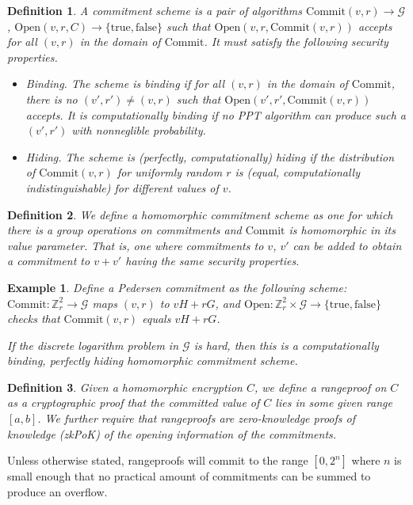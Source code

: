 \documentclass[letterpaper]{article}
\newtheorem{defn}{Definition}
\newtheorem{expl}{Example}
\newcommand{\Commit}{\mathrm{Commit}}
\newcommand{\Open}{\mathrm{Open}}
\newcommand{\truth}{\{\mathrm{true}, \mathrm{false}\}}
\begin{document}
\begin{defn} A \emph{commitment scheme} is a pair of algorithms
$\Commit(v, r)\to\mathcal{G}$, $\Open(v, r, C)\to\truth$ such that
$\Open(v, r, \Commit(v, r))$ accepts for all $(v, r)$ in the domain
of $\Commit$. It must satisfy the following security properties.
\begin{itemize}
\item \emph{Binding.} The scheme is \emph{binding} if for all $(v, r)$ in the
domain of $\Commit$, there is no $(v',r')\neq(v,r)$ such that
$\Open(v', r', \Commit(v, r))$ accepts.
It is \emph{computationally binding} if no PPT algorithm can produce such a
$(v', r')$ with nonneglible probability.
\item \emph{Hiding.} The scheme is \emph{(perfectly, computationally) hiding}
if the distribution of $\mathrm{Commit}(v, r)$ for uniformly random $r$ is
(equal, computationally indistinguishable) for different values of $v$.
\end{itemize}
\end{defn}
\begin{defn} We define a \emph{homomorphic commitment scheme} as one
for which there is a group operations on commitments and $\Commit$ is
homomorphic in its value parameter. That is, one where commitments to
$v$, $v'$ can be added to obtain a commitment to $v+v'$ having the
same security properties.
\end{defn}

\begin{expl} Define a \emph{Pedersen commitment} as the following scheme:
$\Commit:\mathbb{Z}_r^2\to\mathcal{G}$ maps $(v, r)$ to $vH + rG$, and
$\Open:\mathbb{Z}_r^2\times\mathcal{G}\to\truth$ checks that $\Commit(v, r)$
equals $vH + rG$.

If the discrete logarithm problem in  $\mathcal{G}$ is hard, then this
is a computationally binding, perfectly hiding homomorphic commitment
scheme\cite{pedersen2001}.
\end{expl}

\begin{defn} Given a homomorphic encryption $C$, we define a
\emph{rangeproof} on $C$ as a cryptographic proof that the committed
value of $C$ lies in some given range $[a, b]$. We further require
that rangeproofs are zero-knowledge proofs of knowledge (zkPoK) of
the opening information of the commitments.
\end{defn}
Unless otherwise stated, rangeproofs will commit to the range
$[0,2^n]$ where $n$ is small enough that no practical amount
of commitments can be summed to produce an overflow.
\end{document}
